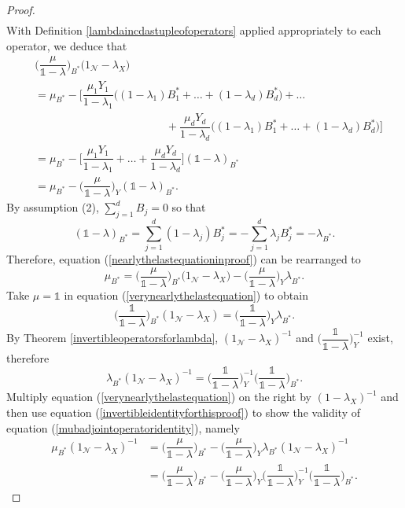 \documentclass[11pt, reqno]{amsart}
\newcommand\1{\boldsymbol {1}}
\numberwithin{equation}{section}
\begin{document}
\begin{proof}
\begin{align*}
\end{align*}
With Definition \ref{lambdaincdastupleofoperators} applied appropriately to each operator, we deduce that
\begin{align}
&\bigg(\dfrac{\mu}{\mathds{1}-\lambda}\bigg)_{B^{*}}\big(1_{\mathcal{N}}-\lambda_{X}\big)\nonumber \\ 
&=\mu_{B^{*}} - \Bigg[ \dfrac{\mu_{1}Y_{1}}{1-\lambda_{1}}\bigg((1-\lambda_{1})B_{1}^{*}+\hdots+(1-\lambda_{d})B_{d}^{*}\bigg)+\hdots \nonumber \\
&\hspace{5cm}+\dfrac{\mu_{d}Y_{d}}{1-\lambda_{d}}\bigg((1-\lambda_{1})B_{1}^{*}+\hdots+(1-\lambda_{d})B_{d}^{*}\bigg)\Bigg]\nonumber\\
& = \mu_{B^{*}} - \bigg[ \dfrac{\mu_{1}Y_{1}}{1-\lambda_{1}}+\hdots+\dfrac{\mu_{d}Y_{d}}{1-\lambda_{d}}\bigg](\mathds{1}-\lambda)_{B^{*}}\nonumber \\
& = \mu_{B^{*}} - \bigg(\dfrac{\mu}{\mathds{1}-\lambda}\bigg)_{Y}(\mathds{1}-\lambda)_{B^{*}}\label{nearlythelastequationinproof}.
\end{align}
By assumption (2), $\sum_{j=1}^{d}B_{j}=0$ so that 
$$(\mathds{1}-\lambda)_{B^{*}} = \sum_{j=1}^{d}(1-\lambda_{j})B_{j}^{*} = -\sum_{j=1}^{d}\lambda_{j}B_{j}^{*} = -\lambda_{B^{*}}. $$ 
Therefore, equation (\ref{nearlythelastequationinproof}) can be rearranged to 
\begin{equation}\label{verynearlythelastequation}
\mu_{B^{*}} = \bigg(\dfrac{\mu}{\mathds{1}-\lambda}\bigg)_{B^{*}}\big(1_{\mathcal{N}}-\lambda_{X}\big) - \bigg(\dfrac{\mu}{\mathds{1}-\lambda}\bigg)_{Y}\lambda_{B^{*}}.
\end{equation}
Take  $\mu=\mathds{1}$ in equation (\ref{verynearlythelastequation}) to obtain
$$\bigg(\dfrac{\mathds{1}}{\mathds{1}-\lambda}\bigg)_{B^{*}}(1_{\mathcal{N}}-\lambda_{X}) = \bigg(\dfrac{\mathds{1}}{\mathds{1}-\lambda}\bigg)_{Y}\lambda_{B^{*}}.$$
By Theorem \ref{invertibleoperatorsforlambda}, $(1_{\mathcal{N}}-\lambda_{X})^{-1}$ and $\Big(\dfrac{\mathds{1}}{\mathds{1}-\lambda}\Big)_{Y}^{-1}$ exist, therefore
\begin{equation}\label{invertibleidentityforthisproof}
\lambda_{B^{*}}(1_{\mathcal{N}}-\lambda_{X})^{-1} =\bigg(\dfrac{\mathds{1}}{\mathds{1}-\lambda}\bigg)_{Y}^{-1}\bigg(\dfrac{\mathds{1}}{\mathds{1}-\lambda}\bigg)_{B^{*}}.
\end{equation}
Multiply equation (\ref{verynearlythelastequation}) on the right by $(1-\lambda_{X})^{-1}$ and then use equation (\ref{invertibleidentityforthisproof}) to show the validity of equation (\ref{mubadjointoperatoridentity}), namely
\begin{align*}
\mu_{B^{*}}(1_{\mathcal{N}}-\lambda_{X})^{-1} &= \bigg(\dfrac{\mu}{\mathds{1}-\lambda}\bigg)_{B^{*}}- \bigg(\dfrac{\mu}{\mathds{1}-\lambda}\bigg)_{Y}\lambda_{B^{*}}(1_{\mathcal{N}}-\lambda_{X})^{-1}\\
			&= \bigg(\dfrac{\mu}{\mathds{1}-\lambda}\bigg)_{B^{*}}- \bigg(\dfrac{\mu}{\mathds{1}-\lambda}\bigg)_{Y}\bigg(\dfrac{\mathds{1}}{\mathds{1}-\lambda}\bigg)_{Y}^{-1}\bigg(\dfrac{\mathds{1}}{\mathds{1}-\lambda}\bigg)_{B^{*}}.
\end{align*}


\end{proof}
\end{document}
